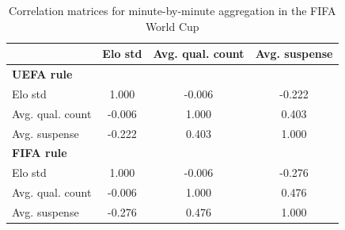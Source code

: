\begin{table}[H]
\centering
\small
\caption{Correlation matrices for minute-by-minute aggregation in the FIFA World Cup}
\label{tab:corr_wc_mbm}
\begin{tabular}{lccc}
\toprule
 & Elo std & Avg. qual. count & Avg. suspense \\
\midrule
\multicolumn{4}{l}{\textbf{UEFA rule}} \\
Elo std             & 1.000 & -0.006 & -0.222 \\
Avg. qual. count    & -0.006 & 1.000 & 0.403 \\
Avg. suspense       & -0.222 & 0.403 & 1.000 \\
\midrule
\multicolumn{4}{l}{\textbf{FIFA rule}} \\
Elo std             & 1.000 & -0.006 & -0.276 \\
Avg. qual. count    & -0.006 & 1.000 & 0.476 \\
Avg. suspense       & -0.276 & 0.476 & 1.000 \\
\bottomrule
\end{tabular}
\end{table}
